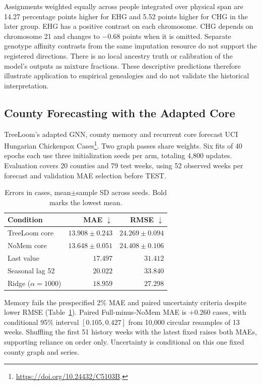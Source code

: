 \documentclass[letterpaper]{article}
\newcommand{\best}[1]{\mathbf{#1}}
\begin{document}
Assignments weighted equally across people integrated over physical span are 14.27 percentage points higher for EHG and 5.52 points higher for CHG in the later group. EHG has a positive contrast on each chromosome. CHG depends on chromosome 21 and changes to $-0.68$ points when it is omitted. Separate genotype affinity contrasts from the same imputation resource do not support the registered directions. There is no local ancestry truth or calibration of the model's outputs as mixture fractions. These descriptive predictions therefore illustrate application to empirical genealogies and do not validate the historical interpretation.

\subsection{County Forecasting with the Adapted Core}
\label{app:countyforecasting}
TreeLoom's adapted GNN, county memory and recurrent core forecast UCI Hungarian Chickenpox Cases\footnote{\url{https://doi.org/10.24432/C5103B}.}. Two graph passes share weights. Six fits of 40 epochs each use three initialization seeds per arm, totaling 4,800 updates. Evaluation covers 20 counties and 79 test weeks, using 52 observed weeks per forecast and validation MAE selection before TEST.

\begin{table}[!htbp]
\centering
\small
\begin{tabular}{@{}lrr@{}}
\toprule
Condition & MAE $\downarrow$ & RMSE $\downarrow$\\
\midrule
TreeLoom core &$13.908\pm0.243$&$\best{24.269\pm0.094}$\\
NoMem core &$\best{13.648\pm0.051}$&$24.408\pm0.106$\\
Last value &$17.497$&$31.412$\\
Seasonal lag 52 &$20.022$&$33.840$\\
Ridge ($\alpha=1000$) &$18.959$&$27.298$\\
\bottomrule
\end{tabular}
\caption{Errors in cases, mean$\pm$sample SD across seeds. Bold marks the lowest mean.}
\label{tab:countyforecasting}
\end{table}

Memory fails the prespecified 2\% MAE and paired uncertainty criteria despite lower RMSE (Table~\ref{tab:countyforecasting}). Paired Full-minus-NoMem MAE is $+0.260$ cases, with conditional 95\% interval $[0.105,0.427]$ from 10,000 circular resamples of 13 weeks. Shuffling the first 51 history weeks with the latest fixed raises both MAEs, supporting reliance on order only. Uncertainty is conditional on this one fixed county graph and series.
\end{document}
